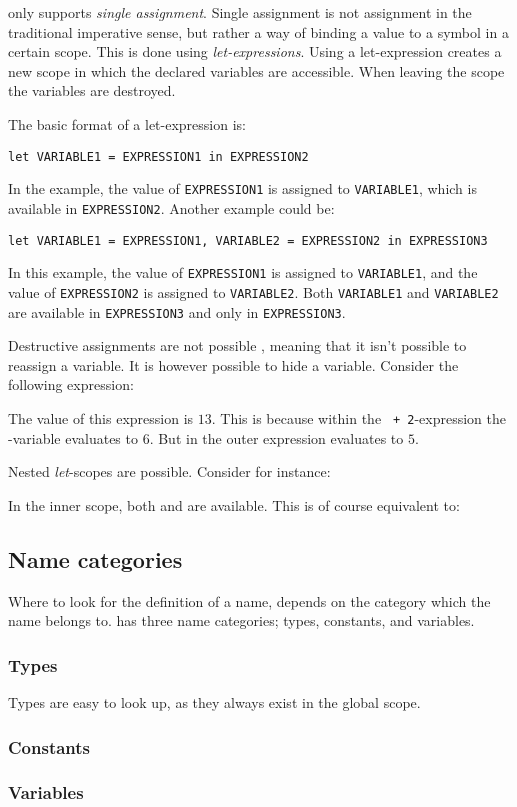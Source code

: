 \productname{} only supports \emph{single assignment}. Single assignment is not assignment
in the traditional imperative sense, but rather a way of binding a value to a symbol in a
certain scope. This is done using \emph{let-expressions}. Using a let-expression creates a
new scope in which the declared variables are accessible. When leaving the scope the
variables are destroyed.

The basic format of a let-expression is:

\texttt{let VARIABLE1 = EXPRESSION1 in EXPRESSION2}

In the example, the value of \texttt{EXPRESSION1} is assigned to \texttt{VARIABLE1}, which
is available in \texttt{EXPRESSION2}. Another example could be:

\texttt{let VARIABLE1 = EXPRESSION1, VARIABLE2 = EXPRESSION2 in EXPRESSION3}

In this example, the value of \texttt{EXPRESSION1} is assigned to \texttt{VARIABLE1}, and
the value of \texttt{EXPRESSION2} is assigned to \texttt{VARIABLE2}. Both \texttt{VARIABLE1}
and \texttt{VARIABLE2} are available in \texttt{EXPRESSION3} and only in \texttt{EXPRESSION3}.

Destructive assignments are not possible \productname{}, meaning that it isn't possible to 
reassign a variable. It is however possible to hide a variable.
Consider the following expression:


The value of this expression is $13$. This is because within the \texttt{ + 2}-expression
the -variable evaluates to $6$. But in the outer expression  evaluates to
$5$.

Nested \emph{let}-scopes are possible. Consider for instance:


In the inner scope, both  and  are available. This is of course equivalent
to:


\subsection{Name categories}

Where to look for the definition of a name, depends on the category which the name belongs to.
\productname{} has three name categories; types, constants, and variables.

\subsubsection{Types}
Types are easy to look up, as they always exist in the global scope.

\subsubsection{Constants}

\subsubsection{Variables}


